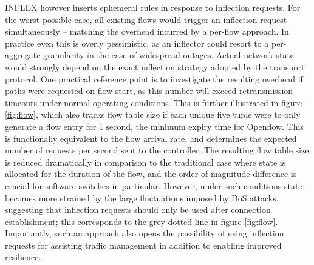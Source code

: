 INFLEX however inserts ephemeral rules in response to inflection requests.
For the worst possible case, all existing flows would trigger an inflection request simultaneously -- matching the overhead incurred by a per-flow approach.
In practice even this is overly pessimistic, as an inflector could resort to a per-aggregate granularity in the case of widespread outages.
Actual network state would strongly depend on the exact inflection strategy adopted by the transport protocol.
One practical reference point is to investigate the resulting overhead if paths were requested on flow start, as this number will exceed retransmission timeouts under normal operating conditions.
This is further illustrated in figure \ref{fig:flow}, which also tracks flow table size if each unique five tuple were to only generate a flow entry for 1 second, the minimum expiry time for Openflow.
This is functionally equivalent to the flow arrival rate, and determines the expected number of requests per second sent to the controller.
The resulting flow table size is reduced dramatically in comparison to the traditional case where state is allocated for the duration of the flow, and the order of magnitude difference is crucial for software switches in particular.
However, under such conditions state becomes more strained by the large fluctuations imposed by \ac{DoS} attacks, suggesting that inflection requests should only be used after connection establishment; this corresponds to the grey dotted line in figure \ref{fig:flow}. Importantly, such an approach also opens the possibility of using inflection requests for assisting traffic management in addition to enabling improved resilience.


